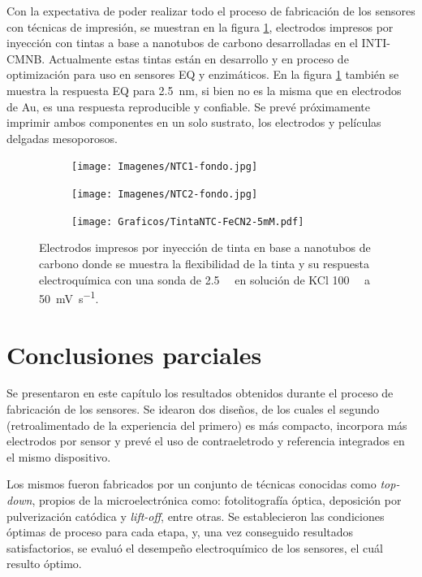 { 	  Con la expectativa de poder realizar todo el proceso de fabricación de los sensores con técnicas de impresión, se muestran en la figura \ref{fig:tintas}, electrodos impresos por inyección con tintas a base a nanotubos de carbono desarrolladas en el INTI-CMNB. Actualmente estas tintas están en desarrollo y en proceso de optimización para uso en sensores EQ y enzimáticos\cite{longinotti2010,Mass2016}. En la figura \ref{fig:tintas} también se muestra la respuesta EQ para \fe\space \SI{2.5}{\nm}, si bien no es la misma que en electrodos de Au, es una respuesta reproducible y confiable. Se prevé próximamente imprimir ambos componentes en un solo sustrato, los electrodos y películas delgadas mesoporosos.

 	  			\begin{figure}[th]
		 	   	    \begin{subfigure}[t]{0.25\textwidth}
			       	\texttt{[image: Imagenes/NTC1-fondo.jpg]}
			   		\end{subfigure}
			   		\begin{subfigure}[t]{0.25\textwidth}
			       	\texttt{[image: Imagenes/NTC2-fondo.jpg]}
			   		\end{subfigure}
			   		\begin{subfigure}[t]{0.43\textwidth}
			   	    \texttt{[image: Graficos/TintaNTC-FeCN2-5mM.pdf]}
			   		\end{subfigure}
					 \caption[Electrodos de NTC flexibles.]{Electrodos impresos por inyección de tinta en base a nanotubos de carbono donde se muestra la flexibilidad de la tinta y su respuesta electroquímica con una sonda de \fe\space \SI{2.5}{\milli\Molar} en solución de KCl \SI{100}{\milli\Molar} a \SI{50}{\milli\volt\per\second}.}
					 \label{fig:tintas}	
				     \end{figure}
 		

\section{Conclusiones parciales}

	Se presentaron en este capítulo los resultados obtenidos durante el proceso de fabricación de los sensores. Se idearon dos diseños, de los cuales el segundo (retroalimentado de la experiencia del primero) es más compacto, incorpora más electrodos por sensor y prevé el uso de contraeletrodo y referencia integrados en el mismo dispositivo.
	
	Los mismos fueron fabricados por un conjunto de técnicas conocidas como \textit{top-down}, propios de la microelectrónica como: fotolitografía óptica, deposición por pulverización catódica y \textit{lift-off}, entre otras. Se establecieron las condiciones óptimas de proceso para cada etapa, y, una vez conseguido resultados satisfactorios, se evaluó el desempeño electroquímico de los sensores, el cuál resulto óptimo. 

}

